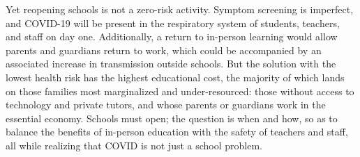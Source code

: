 \documentclass[9pt,twocolumn,twoside,lineno]{pnas-new}
\begin{document}
Yet reopening schools is not a zero-risk activity. Symptom screening is imperfect, and COVID-19 will be present in the respiratory system of students, teachers, and staff on day one. Additionally, a return to in-person learning would allow parents and guardians return to work, which could be accompanied by an associated increase in transmission outside schools. But the solution with the lowest health risk has the highest educational cost, the majority of which lands on those families most marginalized and under-resourced: those without access to technology and private tutors, and whose parents or guardians work in the essential economy. Schools must open; the question is when and how, so as to balance the benefits of in-person education with the safety of teachers and staff, all while realizing that COVID is not just a school problem.







\end{document}
